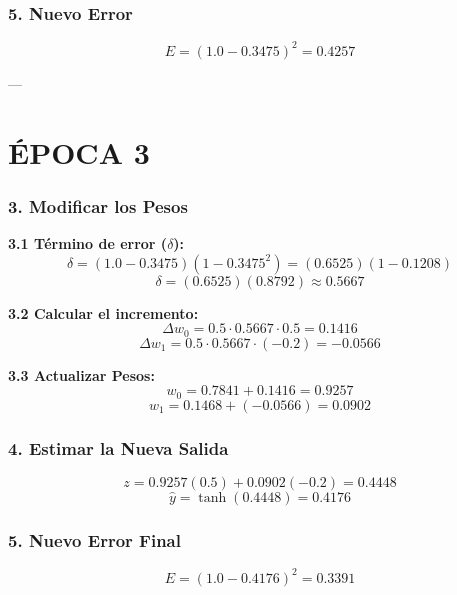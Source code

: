 \documentclass{article}
\begin{document}
\subsubsection*{5. Nuevo Error}
\[ E = (1.0 - 0.3475)^2 = 0.4257 \]

---

\section*{ÉPOCA 3}

\subsubsection*{3. Modificar los Pesos}
\textbf{3.1 Término de error ($\delta$):}
\[ \delta = (1.0 - 0.3475)(1 - 0.3475^2) = (0.6525)(1 - 0.1208) \]
\[ \delta = (0.6525)(0.8792) \approx 0.5667 \]

\textbf{3.2 Calcular el incremento:}
\[ \Delta w_{0} = 0.5 \cdot 0.5667 \cdot 0.5 = 0.1416 \]
\[ \Delta w_{1} = 0.5 \cdot 0.5667 \cdot (-0.2) = -0.0566 \]

\textbf{3.3 Actualizar Pesos:}
\[ w_{0} = 0.7841 + 0.1416 = 0.9257 \]
\[ w_{1} = 0.1468 + (-0.0566) = 0.0902 \]

\subsubsection*{4. Estimar la Nueva Salida}
\[ z = 0.9257(0.5) + 0.0902(-0.2) = 0.4448 \]
\[ \hat{y} = \tanh(0.4448) = 0.4176 \]

\subsubsection*{5. Nuevo Error Final}
\[ E = (1.0 - 0.4176)^2 = 0.3391 \]
\end{document}
